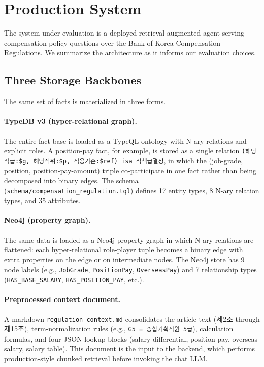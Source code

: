 \section{Production System}\label{sec:system}

The system under evaluation is a deployed retrieval-augmented agent
serving compensation-policy questions over the Bank of Korea
Compensation Regulations. We summarize the architecture as it informs
our evaluation choices.

\subsection{Three Storage Backbones}

The same set of facts is materialized in three forms.

\paragraph{TypeDB v3 (hyper-relational graph).} The entire fact base
is loaded as a TypeQL ontology with N-ary relations and explicit
roles. A position-pay fact, for example, is stored as a single
relation \texttt{(해당직급:\$g, 해당직위:\$p, 적용기준:\$ref) isa
직책급결정}, in which the (job-grade, position, position-pay-amount)
triple co-participate in one fact rather than being decomposed into
binary edges. The schema (\texttt{schema/compensation\_regulation.tql})
defines 17 entity types, 8 N-ary relation types, and 35 attributes.

\paragraph{Neo4j (property graph).} The same data is loaded as a Neo4j
property graph in which N-ary relations are flattened: each
hyper-relational role-player tuple becomes a binary edge with extra
properties on the edge or on intermediate nodes. The Neo4j store has
9 node labels (e.g., \texttt{JobGrade}, \texttt{PositionPay},
\texttt{OverseasPay}) and 7 relationship types
(\texttt{HAS\_BASE\_SALARY}, \texttt{HAS\_POSITION\_PAY}, etc.).

\paragraph{Preprocessed context document.} A markdown
\texttt{regulation\_context.md} consolidates the article text (제2조
through 제15조), term-normalization rules (e.g., \texttt{G5 =
종합기획직원 5급}), calculation formulas, and four JSON lookup blocks
(salary differential, position pay, overseas salary, salary table).
This document is the input to the  backend,
which performs production-style chunked retrieval before invoking
the chat LLM.


